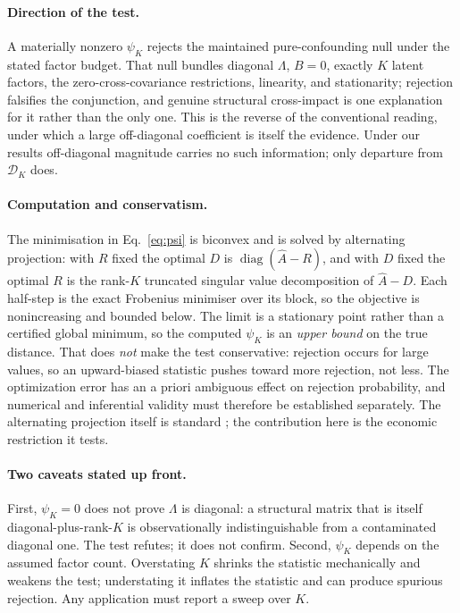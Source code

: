 \documentclass[10pt,twocolumn]{article}
\theoremstyle{remark}
\newcommand{\diag}{\operatorname{diag}}
\begin{document}
\paragraph{Direction of the test.} A materially nonzero $\psi_K$ rejects the
maintained pure-confounding null under the stated factor budget. That null
bundles diagonal $\Lambda$, $B=0$, exactly $K$ latent factors, the
zero-cross-covariance restrictions, linearity, and stationarity; rejection
falsifies the conjunction, and genuine structural cross-impact is one
explanation for it rather than the only one. This is the reverse of the conventional reading, under which a
large off-diagonal coefficient is itself the evidence. Under our results
off-diagonal magnitude carries no such information; only departure from
$\mathcal D_K$ does.

\paragraph{Computation and conservatism.} The minimisation in
Eq.~\eqref{eq:psi} is biconvex and is solved by alternating projection: with
$R$ fixed the optimal $D$ is $\diag(\widehat A-R)$, and with $D$ fixed the
optimal $R$ is the rank-$K$ truncated singular value decomposition of
$\widehat A-D$. Each half-step is the exact Frobenius minimiser over its block,
so the objective is nonincreasing and bounded below. The limit is a stationary
point rather than a certified global minimum, so the computed $\psi_K$ is an
\emph{upper bound} on the true distance. That does \emph{not} make the test
conservative: rejection occurs for large values, so an upward-biased statistic
pushes toward more rejection, not less. The optimization error has an a priori
ambiguous effect on rejection probability, and numerical and inferential
validity must therefore be established separately. The alternating projection
itself is standard
\cite{ChandrasekaranEtAl2011}; the contribution here is the economic
restriction it tests.

\paragraph{Two caveats stated up front.} First, $\psi_K=0$ does not prove
$\Lambda$ is diagonal: a structural matrix that is itself
diagonal-plus-rank-$K$ is observationally indistinguishable from a
contaminated diagonal one. The test refutes; it does not confirm. Second,
$\psi_K$ depends on the assumed factor count. Overstating $K$ shrinks the
statistic mechanically and weakens the test; understating it inflates the
statistic and can produce spurious rejection. Any application must report a
sweep over $K$.
\end{document}
